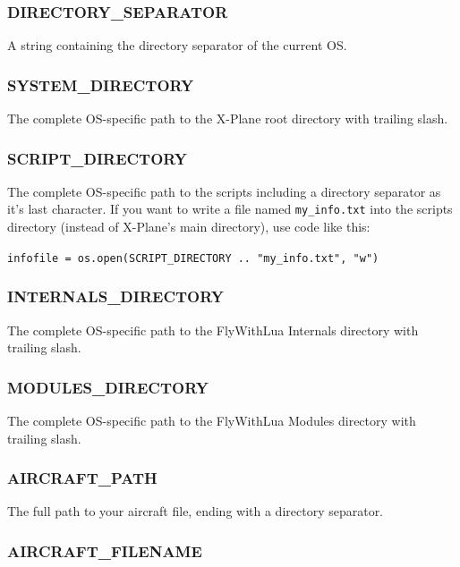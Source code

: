 \documentclass[11pt,parskip=half,a4paper]{scrartcl}
\begin{document}
\subsubsection{DIRECTORY\_SEPARATOR}

A string containing the directory separator of the current OS.

\subsubsection{SYSTEM\_DIRECTORY}

The complete OS-specific path to the X-Plane root directory with trailing slash.

\subsubsection{SCRIPT\_DIRECTORY}

The complete OS-specific path to the scripts including a directory separator as it's last character. If you want to write a file named \verb|my_info.txt| into the scripts directory (instead of X-Plane's main directory), use code like this:

\verb|infofile = os.open(SCRIPT_DIRECTORY .. "my_info.txt", "w")|

\subsubsection{INTERNALS\_DIRECTORY}

The complete OS-specific path to the FlyWithLua Internals directory with trailing slash.

\subsubsection{MODULES\_DIRECTORY}

The complete OS-specific path to the FlyWithLua Modules directory with trailing slash.

\subsubsection{AIRCRAFT\_PATH}

The full path to your aircraft file, ending with a directory separator.

\subsubsection{AIRCRAFT\_FILENAME}
\end{document}
